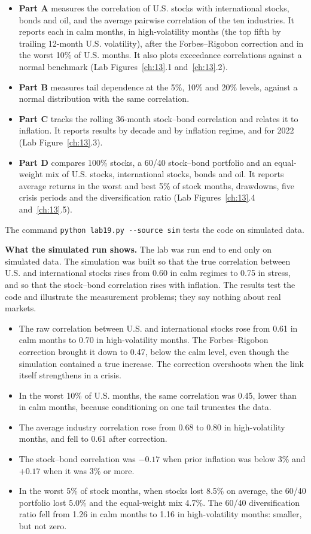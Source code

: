 \begin{itemize}
  \item \textbf{Part A} measures the correlation of U.S. stocks with international stocks, bonds and oil, and the average pairwise correlation of the ten industries. It reports each in calm months, in high-volatility months (the top fifth by trailing 12-month U.S. volatility), after the Forbes--Rigobon correction and in the worst 10\% of U.S. months. It also plots exceedance correlations against a normal benchmark (Lab Figures~\ref{ch:13}.1 and~\ref{ch:13}.2).
  \item \textbf{Part B} measures tail dependence at the 5\%, 10\% and 20\% levels, against a normal distribution with the same correlation.
  \item \textbf{Part C} tracks the rolling 36-month stock--bond correlation and relates it to inflation. It reports results by decade and by inflation regime, and for 2022 (Lab Figure~\ref{ch:13}.3).
  \item \textbf{Part D} compares 100\% stocks, a 60/40 stock--bond portfolio and an equal-weight mix of U.S. stocks, international stocks, bonds and oil. It reports average returns in the worst and best 5\% of stock months, drawdowns, five crisis periods and the diversification ratio (Lab Figures~\ref{ch:13}.4 and~\ref{ch:13}.5).
\end{itemize}

The command \texttt{python lab19.py -{}-source sim} tests the code on simulated data.

\textbf{What the simulated run shows.} The lab was run end to end only on simulated data. The simulation was built so that the true correlation between U.S. and international stocks rises from 0.60 in calm regimes to 0.75 in stress, and so that the stock--bond correlation rises with inflation. The results test the code and illustrate the measurement problems; they say nothing about real markets.

\begin{itemize}
  \item The raw correlation between U.S. and international stocks rose from 0.61 in calm months to 0.70 in high-volatility months. The Forbes--Rigobon correction brought it down to 0.47, below the calm level, even though the simulation contained a true increase. The correction overshoots when the link itself strengthens in a crisis.
  \item In the worst 10\% of U.S. months, the same correlation was 0.45, lower than in calm months, because conditioning on one tail truncates the data.
  \item The average industry correlation rose from 0.68 to 0.80 in high-volatility months, and fell to 0.61 after correction.
  \item The stock--bond correlation was $-0.17$ when prior inflation was below 3\% and $+0.17$ when it was 3\% or more.
  \item In the worst 5\% of stock months, when stocks lost 8.5\% on average, the 60/40 portfolio lost 5.0\% and the equal-weight mix 4.7\%. The 60/40 diversification ratio fell from 1.26 in calm months to 1.16 in high-volatility months: smaller, but not zero.
\end{itemize}

